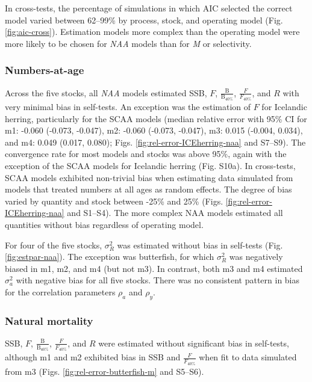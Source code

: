 \documentclass[]{article}
\begin{document}
In cross-tests, the percentage of simulations in which AIC selected the
correct model varied between 62--99\% by process, stock, and operating
model (Fig. \ref{fig:aic-cross}). Estimation models more complex than
the operating model were more likely to be chosen for \emph{NAA} models
than for \emph{M} or selectivity.

\hypertarget{numbers-at-age}{%
\subsubsection{Numbers-at-age}\label{numbers-at-age}}

Across the five stocks, all \emph{NAA} models estimated SSB, \(F\),
\(\frac{\text{B}}{\text{B}_{40\%}}\), \(\frac{F}{F_{40\%}}\), and \(R\)
with very minimal bias in self-tests. An exception was the estimation of
\(F\) for Icelandic herring, particularly for the SCAA models (median
relative error with 95\% CI for m1: -0.060 (-0.073, -0.047), m2: -0.060
(-0.073, -0.047), m3: 0.015 (-0.004, 0.034), and m4: 0.049 (0.017,
0.080); Figs. \ref{fig:rel-error-ICEherring-naa} and S7--S9). The
convergence rate for most models and stocks was above 95\%, again with
the exception of the SCAA models for Icelandic herring (Fig. S10a). In
cross-tests, SCAA models exhibited non-trivial bias when estimating data
simulated from models that treated numbers at all ages as random
effects. The degree of bias varied by quantity and stock between -25\%
and 25\% (Figs. \ref{fig:rel-error-ICEherring-naa} and S1--S4). The more
complex NAA models estimated all quantities without bias regardless of
operating model.

For four of the five stocks, \(\sigma^2_R\) was estimated without bias
in self-tests (Fig. \ref{fig:estpar-naa}). The exception was butterfish,
for which \(\sigma^2_R\) was negatively biased in m1, m2, and m4 (but
not m3). In contrast, both m3 and m4 estimated \(\sigma^2_a\) with
negative bias for all five stocks. There was no consistent pattern in
bias for the correlation parameters \(\rho_a\) and \(\rho_y\).

\hypertarget{natural-mortality}{%
\subsubsection{Natural mortality}\label{natural-mortality}}

SSB, \(F\), \(\frac{\text{B}}{\text{B}_{40\%}}\),
\(\frac{F}{F_{40\%}}\), and \(R\) were estimated without significant
bias in self-tests, although m1 and m2 exhibited bias in SSB and
\(\frac{F}{F_{40\%}}\) when fit to data simulated from m3 (Figs.
\ref{fig:rel-error-butterfish-m} and S5--S6).
\end{document}
